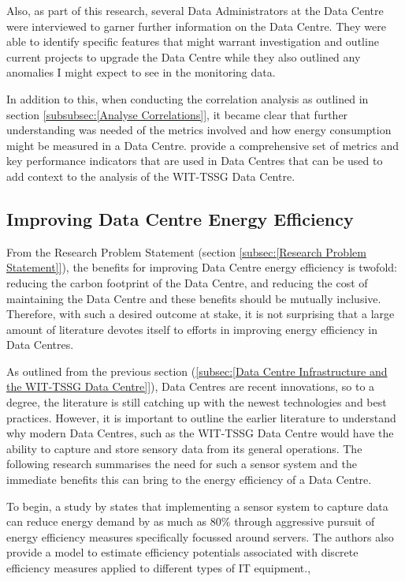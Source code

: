 \documentclass[12pt]{scrartcl}
\begin{document}
Also, as part of this research, several Data Administrators at the Data Centre were interviewed to garner further information on the Data Centre. They were able to identify specific features that might warrant investigation and outline current projects to upgrade the Data Centre while they also outlined any anomalies I might expect to see in the monitoring data.  

In addition to this, when conducting the correlation analysis as outlined in section \ref{subsubsec:[Analyse Correlations]}, it became clear that further understanding was needed of the metrics involved and how energy consumption might be measured in a Data Centre. \cite{edseee.792155120170101} provide a comprehensive set of metrics and key performance indicators that are used in Data Centres that can be used to add context to the analysis of the WIT-TSSG Data Centre. 


\subsection{Improving Data Centre Energy Efficiency}
\label{subsec:[Improving Data Centre Energy Efficiency]}

From the Research Problem Statement (section \ref{subsec:[Research Problem Statement]}), the benefits for improving Data Centre energy efficiency is twofold: reducing the carbon footprint of the Data Centre, and reducing the cost of maintaining the Data Centre and these benefits should be mutually inclusive. Therefore, with such a desired outcome at stake, it is not surprising that a large amount of literature devotes itself to efforts in improving energy efficiency in Data Centres.

As outlined from the previous section (\ref{subsec:[Data Centre Infrastructure and the WIT-TSSG Data Centre]}), Data Centres are recent innovations, so to a degree, the literature is still catching up with the newest technologies and best practices. However, it is important to outline the earlier literature to understand why modern Data Centres, such as the WIT-TSSG Data Centre would have the ability to capture and store sensory data from its general operations. The following research summarises the need for such a sensor system and the immediate benefits this can bring to the energy efficiency of a Data Centre.   

To begin, a study by \citet{edsbas.A50BA51A20120101} states that implementing a sensor system to capture data can reduce energy demand by as much as 80\% through aggressive pursuit of energy efficiency measures specifically focussed around servers. The authors also provide a model to estimate efficiency potentials associated with discrete efficiency measures applied to different types of IT equipment., 
\end{document}
